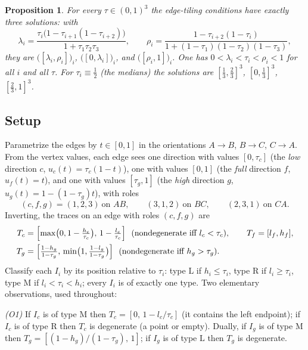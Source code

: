 \documentclass[11pt,reqno]{amsart}
\theoremstyle{plain}
\newtheorem{proposition}[theorem]{Proposition}
\theoremstyle{definition}
\theoremstyle{remark}
\begin{document}
\begin{proposition}\label{prop:tilings}
For every $\tau\in(0,1)^3$ the edge-tiling conditions have exactly three
solutions: with
\[
\lambda_i=\frac{\tau_i\bigl(1-\tau_{i+1}(1-\tau_{i+2})\bigr)}{1+\tau_1\tau_2\tau_3},
\qquad
\rho_i=\frac{1-\tau_{i+2}(1-\tau_i)}{1+(1-\tau_1)(1-\tau_2)(1-\tau_3)},
\]
they are $\bigl([\lambda_i,\rho_i]\bigr)_i$, $\bigl([0,\lambda_i]\bigr)_i$, and
$\bigl([\rho_i,1]\bigr)_i$. One has $0<\lambda_i<\tau_i<\rho_i<1$ for all $i$ and
all $\tau$. For $\tau_i\equiv\tfrac12$ (the medians) the solutions are
$[\tfrac13,\tfrac23]^3$, $[0,\tfrac13]^3$, $[\tfrac23,1]^3$.
\end{proposition}

\subsection*{Setup}
Parametrize the edges by $t\in[0,1]$ in the orientations $A\!\to\!B$,
$B\!\to\!C$, $C\!\to\!A$. From the vertex values, each edge sees one direction
with values $[0,\tau_c]$ (the \emph{low} direction $c$, $u_c(t)=\tau_c(1-t)$),
one with values $[0,1]$ (the \emph{full} direction $f$, $u_f(t)=t$), and one
with values $[\tau_g,1]$ (the \emph{high} direction $g$,
$u_g(t)=1-(1-\tau_g)t$), with roles
\[
(c,f,g)=(1,2,3)\ \text{on } AB,\qquad (3,1,2)\ \text{on } BC,\qquad
(2,3,1)\ \text{on } CA .
\]
Inverting, the traces on an edge with roles $(c,f,g)$ are
\begin{equation}\label{eq:traces}
\begin{aligned}
T_c&=\Bigl[\max\bigl(0,1-\tfrac{h_c}{\tau_c}\bigr),\,1-\tfrac{l_c}{\tau_c}\Bigr]
\ \ (\text{nondegenerate iff }l_c<\tau_c),\qquad T_f=[l_f,h_f],\\
T_g&=\Bigl[\tfrac{1-h_g}{1-\tau_g},\,
\min\bigl(1,\tfrac{1-l_g}{1-\tau_g}\bigr)\Bigr]
\ \ (\text{nondegenerate iff }h_g>\tau_g).
\end{aligned}
\end{equation}
Classify each $I_i$ by its position relative to $\tau_i$: type $\mathrm L$ if
$h_i\le\tau_i$, type $\mathrm R$ if $l_i\ge\tau_i$, type $\mathrm M$ if
$l_i<\tau_i<h_i$; every $I_i$ is of exactly one type. Two elementary
observations, used throughout:

\emph{(O1)} If $I_c$ is of type $\mathrm M$ then $T_c=[0,\,1-l_c/\tau_c]$ (it
contains the left endpoint); if $I_c$ is of type $\mathrm R$ then $T_c$ is
degenerate (a point or empty). Dually, if $I_g$ is of type $\mathrm M$ then
$T_g=[(1-h_g)/(1-\tau_g),\,1]$; if $I_g$ is of type $\mathrm L$ then $T_g$ is
degenerate.
\end{document}
